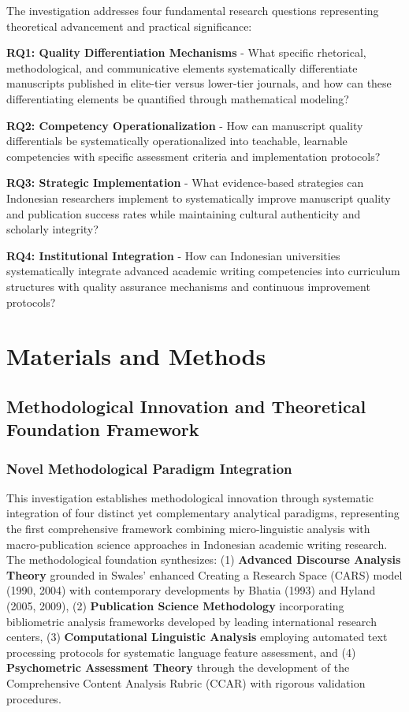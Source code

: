\documentclass[journal,article,submit,pdftex,moreauthors]{Definitions/mdpi}
\begin{document}
The investigation addresses four fundamental research questions representing theoretical advancement and practical significance:

\textbf{RQ1: Quality Differentiation Mechanisms} - What specific rhetorical, methodological, and communicative elements systematically differentiate manuscripts published in elite-tier versus lower-tier journals, and how can these differentiating elements be quantified through mathematical modeling?

\textbf{RQ2: Competency Operationalization} - How can manuscript quality differentials be systematically operationalized into teachable, learnable competencies with specific assessment criteria and implementation protocols?

\textbf{RQ3: Strategic Implementation} - What evidence-based strategies can Indonesian researchers implement to systematically improve manuscript quality and publication success rates while maintaining cultural authenticity and scholarly integrity?

\textbf{RQ4: Institutional Integration} - How can Indonesian universities systematically integrate advanced academic writing competencies into curriculum structures with quality assurance mechanisms and continuous improvement protocols?

\section{Materials and Methods}

\subsection{Methodological Innovation and Theoretical Foundation Framework}

\subsubsection{Novel Methodological Paradigm Integration}

This investigation establishes methodological innovation through systematic integration of four distinct yet complementary analytical paradigms, representing the first comprehensive framework combining micro-linguistic analysis with macro-publication science approaches in Indonesian academic writing research. The methodological foundation synthesizes: (1) \textbf{Advanced Discourse Analysis Theory} grounded in Swales' enhanced Creating a Research Space (CARS) model (1990, 2004) with contemporary developments by Bhatia (1993) and Hyland (2005, 2009), (2) \textbf{Publication Science Methodology} incorporating bibliometric analysis frameworks developed by leading international research centers, (3) \textbf{Computational Linguistic Analysis} employing automated text processing protocols for systematic language feature assessment, and (4) \textbf{Psychometric Assessment Theory} through the development of the Comprehensive Content Analysis Rubric (CCAR) with rigorous validation procedures.
\end{document}
